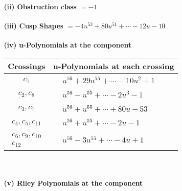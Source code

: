 \documentclass[1p]{elsarticle_modified}
\theoremstyle{definition}
\begin{document}
\flushleft \textbf{(ii) Obstruction class $= -1$}\\~\\
\flushleft \textbf{(iii) Cusp Shapes $= -4 u^{53}+80 u^{51}+\cdots-12 u-10$}\\~\\
\newpage\renewcommand{\arraystretch}{1}
\flushleft \textbf{(iv) u-Polynomials at the component}\newline \\
\begin{tabular}{m{50pt}|m{274pt}}
Crossings & \hspace{64pt}u-Polynomials at each crossing \\
\hline $$\begin{aligned}c_{1}\end{aligned}$$&$\begin{aligned}
&u^{56}+29 u^{55}+\cdots-10 u^2+1
\end{aligned}$\\
\hline $$\begin{aligned}c_{2},c_{8}\end{aligned}$$&$\begin{aligned}
&u^{56}- u^{55}+\cdots-2 u^3-1
\end{aligned}$\\
\hline $$\begin{aligned}c_{3},c_{7}\end{aligned}$$&$\begin{aligned}
&u^{56}+u^{55}+\cdots+80 u-53
\end{aligned}$\\
\hline $$\begin{aligned}c_{4},c_{5},c_{11}\end{aligned}$$&$\begin{aligned}
&u^{56}+u^{55}+\cdots-2 u-1
\end{aligned}$\\
\hline $$\begin{aligned}c_{6},c_{9},c_{10}\\c_{12}\end{aligned}$$&$\begin{aligned}
&u^{56}-3 u^{55}+\cdots-4 u+1
\end{aligned}$\\
\hline
\end{tabular}\\~\\
\newpage\renewcommand{\arraystretch}{1}
\flushleft \textbf{(v) Riley Polynomials at the component}\newline \\
\end{document}
